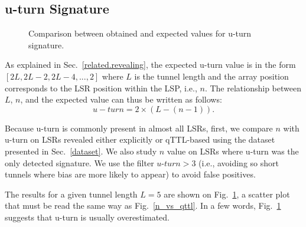 \subsection{u-turn Signature}\label{validation.uturn}
\begin{figure}[!t]
  \begin{center}    
\hspace{-0.3cm}      
  \end{center}
  \caption{Comparison between obtained and expected values for u-turn
  signature.}
  \label{validation.uturn.fig}
\end{figure}

As explained in Sec.~\ref{related.revealing},  the expected u-turn value is in
the form $[2L, 2L-2, 2L-4,..., 2]$ where $L$ is the tunnel length and the array
position corresponds to the LSR position within the LSP, i.e., $n$.  The
relationship between $L$, $n$, and the expected value can thus be written as
follows:
\begin{equation}
u-turn = 2 \times (L - (n-1)) .
\label{eqn.uturn}
\end{equation}


Because u-turn is commonly present in almost all LSRs, first, we compare $n$
with u-turn on LSRs revealed either explicitly or qTTL-based using the dataset
presented in Sec.~\ref{dataset}.  We also study  $n$ value on LSRs where u-turn
was the only detected signature. We use the filter $\textit{u-turn}>3$ (i.e.,
avoiding so short tunnels where bias are more likely to appear) to avoid false
positives.

The results for a given tunnel length $L=5$ are shown on
Fig.~\ref{validation.uturn.fig}, a scatter plot that must be read the same way
as Fig.~\ref{n_vs_qttl}.  In a few words, Fig.~\ref{validation.uturn.fig}
suggests that u-turn is usually overestimated.  


